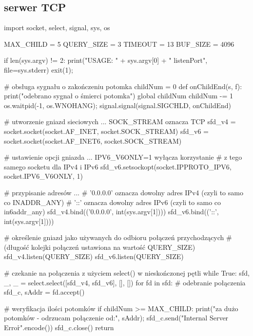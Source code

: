 \subsection{serwer TCP}
\begin{CodeFrame*}[python]{}
import socket, select, signal, sys, os

MAX_CHILD = 5
QUERY_SIZE = 3
TIMEOUT = 13
BUF_SIZE = 4096

if len(sys.argv) != 2:
    print("USAGE: " + sys.argv[0] + " listenPort", file=sys.stderr)
    exit(1);

# obsługa sygnału o zakończeniu potomka
childNum = 0
def onChildEnd(s, f):
    print("odebrano sygnał o śmierci potomka")
    global childNum
    childNum -= 1
    os.waitpid(-1, os.WNOHANG);
signal.signal(signal.SIGCHLD, onChildEnd)

# utworzenie gniazd sieciowych ... SOCK_STREAM oznacza TCP
sfd_v4 = socket.socket(socket.AF_INET,  socket.SOCK_STREAM)
sfd_v6 = socket.socket(socket.AF_INET6, socket.SOCK_STREAM)

# ustawienie opcji gniazda ... IPV6_V6ONLY=1 wyłącza korzystanie
# z tego samego socketu dla IPv4 i IPv6
sfd_v6.setsockopt(socket.IPPROTO_IPV6, socket.IPV6_V6ONLY, 1)

# przypisanie adresów ...
# '0.0.0.0' oznacza dowolny adres IPv4 (czyli to samo co INADDR_ANY)
# '::' oznacza dowolny adres IPv6 (czyli to samo co in6addr_any)
sfd_v4.bind(('0.0.0.0', int(sys.argv[1])))
sfd_v6.bind(('::',      int(sys.argv[1])))

# określenie gniazd jako używanych do odbioru połączeń przychodzących
# (długość kolejki połączeń ustawiona na wartość QUERY_SIZE)
sfd_v4.listen(QUERY_SIZE)
sfd_v6.listen(QUERY_SIZE)

# czekanie na połączenia z użyciem select() w nieskończonej pętli
while True:
    sfd, _, _ = select.select([sfd_v4, sfd_v6], [], [])
    for fd in sfd:
        #  odebranie połączenia
        sfd_c, sAddr = fd.accept()
        
        # weryfikacja ilości potomków
        if childNum >= MAX_CHILD:
            print("za dużo potomków - odrzucam połączenie od:", sAddr);
            sfd_c.send("Internal Server Error\r\n".encode())
            sfd_c.close()
            return
        

\end{CodeFrame*}
